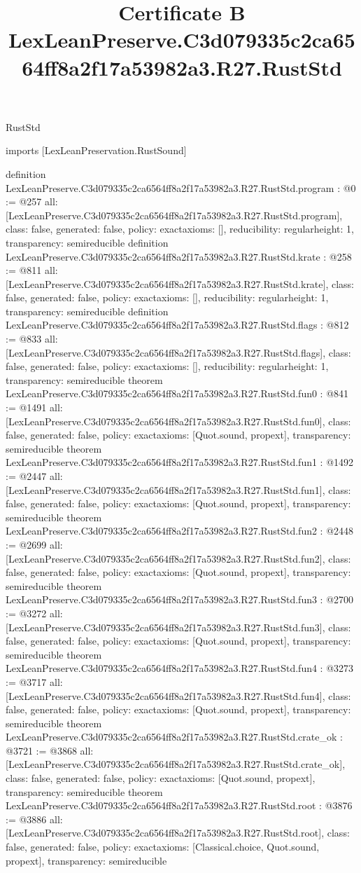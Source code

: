 \begin{lexlean}{RustStd}
\title{Certificate B LexLeanPreserve.C3d079335c2ca6564ff8a2f17a53982a3.R27.RustStd}
\begin{coremodule}
imports [LexLeanPreservation.RustSound]

definition LexLeanPreserve.C3d079335c2ca6564ff8a2f17a53982a3.R27.RustStd.program : @0 := @257 {
  all: [LexLeanPreserve.C3d079335c2ca6564ff8a2f17a53982a3.R27.RustStd.program],
  class: false,
  generated: false,
  policy: exact{axioms: []},
  reducibility: regular{height: 1},
  transparency: semireducible
}
definition LexLeanPreserve.C3d079335c2ca6564ff8a2f17a53982a3.R27.RustStd.krate : @258 := @811 {
  all: [LexLeanPreserve.C3d079335c2ca6564ff8a2f17a53982a3.R27.RustStd.krate],
  class: false,
  generated: false,
  policy: exact{axioms: []},
  reducibility: regular{height: 1},
  transparency: semireducible
}
definition LexLeanPreserve.C3d079335c2ca6564ff8a2f17a53982a3.R27.RustStd.flags : @812 := @833 {
  all: [LexLeanPreserve.C3d079335c2ca6564ff8a2f17a53982a3.R27.RustStd.flags],
  class: false,
  generated: false,
  policy: exact{axioms: []},
  reducibility: regular{height: 1},
  transparency: semireducible
}
theorem LexLeanPreserve.C3d079335c2ca6564ff8a2f17a53982a3.R27.RustStd.fun0 : @841 := @1491 {
  all: [LexLeanPreserve.C3d079335c2ca6564ff8a2f17a53982a3.R27.RustStd.fun0],
  class: false,
  generated: false,
  policy: exact{axioms: [Quot.sound, propext]},
  transparency: semireducible
}
theorem LexLeanPreserve.C3d079335c2ca6564ff8a2f17a53982a3.R27.RustStd.fun1 : @1492 := @2447 {
  all: [LexLeanPreserve.C3d079335c2ca6564ff8a2f17a53982a3.R27.RustStd.fun1],
  class: false,
  generated: false,
  policy: exact{axioms: [Quot.sound, propext]},
  transparency: semireducible
}
theorem LexLeanPreserve.C3d079335c2ca6564ff8a2f17a53982a3.R27.RustStd.fun2 : @2448 := @2699 {
  all: [LexLeanPreserve.C3d079335c2ca6564ff8a2f17a53982a3.R27.RustStd.fun2],
  class: false,
  generated: false,
  policy: exact{axioms: [Quot.sound, propext]},
  transparency: semireducible
}
theorem LexLeanPreserve.C3d079335c2ca6564ff8a2f17a53982a3.R27.RustStd.fun3 : @2700 := @3272 {
  all: [LexLeanPreserve.C3d079335c2ca6564ff8a2f17a53982a3.R27.RustStd.fun3],
  class: false,
  generated: false,
  policy: exact{axioms: [Quot.sound, propext]},
  transparency: semireducible
}
theorem LexLeanPreserve.C3d079335c2ca6564ff8a2f17a53982a3.R27.RustStd.fun4 : @3273 := @3717 {
  all: [LexLeanPreserve.C3d079335c2ca6564ff8a2f17a53982a3.R27.RustStd.fun4],
  class: false,
  generated: false,
  policy: exact{axioms: [Quot.sound, propext]},
  transparency: semireducible
}
theorem LexLeanPreserve.C3d079335c2ca6564ff8a2f17a53982a3.R27.RustStd.crate_ok : @3721 := @3868 {
  all: [LexLeanPreserve.C3d079335c2ca6564ff8a2f17a53982a3.R27.RustStd.crate_ok],
  class: false,
  generated: false,
  policy: exact{axioms: [Quot.sound, propext]},
  transparency: semireducible
}
theorem LexLeanPreserve.C3d079335c2ca6564ff8a2f17a53982a3.R27.RustStd.root : @3876 := @3886 {
  all: [LexLeanPreserve.C3d079335c2ca6564ff8a2f17a53982a3.R27.RustStd.root],
  class: false,
  generated: false,
  policy: exact{axioms: [Classical.choice, Quot.sound, propext]},
  transparency: semireducible
}


\end{coremodule}
\end{lexlean}
